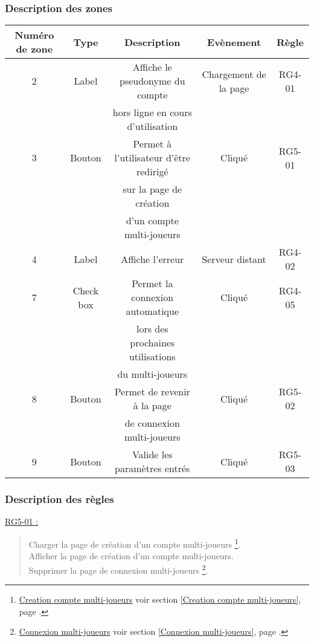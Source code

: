 \documentclass{report}
\begin{document}
		\subsubsection{Description des zones}
		
			\begin{tabular}{|c|c|c|c|c|} \hline
				Numéro de zone & Type  & Description & Evènement &	Règle \\\hline
				2 & Label & Affiche le pseudonyme du compte & Chargement de la page & RG4-01 \\
				  &       & hors ligne en cours d'utilisation & & \\\hline
				3 & Bouton & Permet à l'utilisateur d'être redirigé & Cliqué & RG5-01\\
				  &        & sur la page de création  & & \\
				  &        & d'un compte multi-joueurs \footnotemark[1] & & \\\hline
				4 & Label & Affiche l'erreur & Serveur distant & RG4-02 \\\hline
				7 & Check box & Permet la connexion automatique & Cliqué & RG4-05 \\
				  &           & lors des prochaines utilisations&        & \\				
				  &           & du multi-joueurs                &        & \\\hline
				8 & Bouton & Permet de revenir à la page & Cliqué & RG5-02 \\
				  &        & de connexion multi-joueurs \footnotemark[2] & & \\\hline
				9 & Bouton & Valide les paramètres entrés & Cliqué & RG5-03 \\\hline
			\end{tabular}
			
		\subsubsection{Description des règles}

			\underline{RG5-01 :}
				\begin{quote}
					Charger la page de création d'un compte multi-joueurs%
						\footnote[1]{
							\hyperlink{Creation compte multi-joueurs}{Creation compte multi-joueurs}
							\og voir section \ref{Creation compte multi-joueurs}, page \pageref{Creation compte multi-joueurs}.\fg
						}.\\
					Afficher la page de création d'un compte multi-joueurs\footnotemark[1].\\
					Supprimer la page de connexion multi-joueurs%
						\footnote[2]{
							\hyperlink{Connexion multi-joueurs}{Connexion multi-joueurs}
							\og voir section \ref{Connexion multi-joueurs}, page \pageref{Connexion multi-joueurs}.\fg
						}.\\
				\end{quote}	
\end{document}
